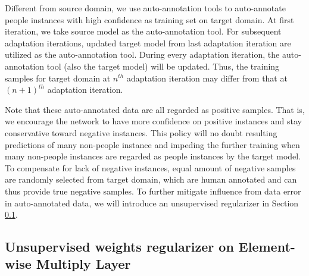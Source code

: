 \documentclass[runningheads]{llncs}
\begin{document}
Different from source domain, we use auto-annotation tools to auto-annotate people instances with high confidence as training set on target domain. At first iteration, we take source model as the auto-annotation tool. For subsequent adaptation iterations, updated target model from last adaptation iteration are utilized as the auto-annotation tool. During every adaptation iteration, the auto-annotation tool (also the target model) will be updated. Thus, the training samples for target domain at $n^{th}$ adaptation iteration may differ from that at $(n+1)^{th}$ adaptation iteration.

Note that these auto-annotated data are all regarded as positive samples. That is, we encourage the network to have more confidence on positive instances and stay conservative toward negative instances. This policy will no doubt resulting predictions of many non-people instance and impeding the further training when many non-people instances are regarded as people instances by the target model. To compensate for lack of negative instances, equal amount of negative samples are randomly selected from target domain, which are human annotated and can thus provide true negative samples. To further mitigate influence from data error in auto-annotated data, we will introduce an unsupervised regularizer in Section \ref{Section:Unsupervised weights regularizer on Element-wise Multiply Layer}.


\subsection{Unsupervised weights regularizer on Element-wise Multiply Layer}
\label{Section:Unsupervised weights regularizer on Element-wise Multiply Layer}
\end{document}
